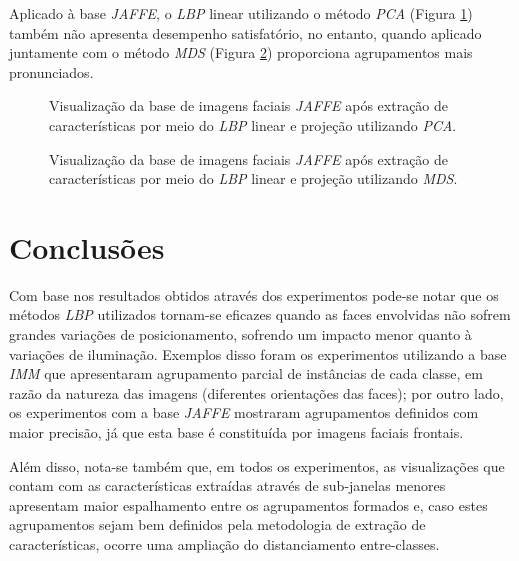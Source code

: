 \documentclass[conference]{IEEEtran}
\begin{document}
Aplicado à base \textit{JAFFE}, o \textit{LBP} linear utilizando o método \textit{PCA} (Figura \ref{fig_lbp_result_linear_jaffe_pca}) também não apresenta desempenho satisfatório, no entanto, quando aplicado juntamente com o método \textit{MDS} (Figura \ref{fig_lbp_result_linear_jaffe}) proporciona agrupamentos mais pronunciados.

\begin{figure}[h]
\center
\leavevmode
{}
\qquad
{}
\caption{Visualização da base de imagens faciais \textit{JAFFE} após extração de características por meio do \textit{LBP} linear e projeção utilizando \textit{PCA}.}
 \label{fig_lbp_result_linear_jaffe_pca}
\end{figure}

\begin{figure}[h]
\center
\leavevmode
{}
\qquad
{}
\caption{Visualização da base de imagens faciais \textit{JAFFE} após extração de características por meio do \textit{LBP} linear e projeção utilizando \textit{MDS}.}
 \label{fig_lbp_result_linear_jaffe}
\end{figure}

\section{Conclusões}
\label{sec_conclusao}

Com base nos resultados obtidos através dos experimentos pode-se notar que os métodos \textit{LBP} utilizados tornam-se eficazes quando as faces envolvidas não sofrem grandes variações de posicionamento, sofrendo um impacto menor quanto à variações de iluminação. Exemplos disso foram os experimentos utilizando a base \textit{IMM} que apresentaram agrupamento parcial de instâncias de cada classe, em razão da natureza das imagens (diferentes orientações das faces); por outro lado, os experimentos com a base \textit{JAFFE} mostraram agrupamentos definidos com maior precisão, já que esta base é constituída por imagens faciais frontais.

Além disso, nota-se também que, em todos os experimentos, as visualizações que contam com as características extraídas através de sub-janelas menores apresentam maior espalhamento entre os agrupamentos formados e, caso estes agrupamentos sejam bem definidos pela metodologia de extração de características, ocorre uma ampliação do distanciamento entre-classes.
\end{document}
